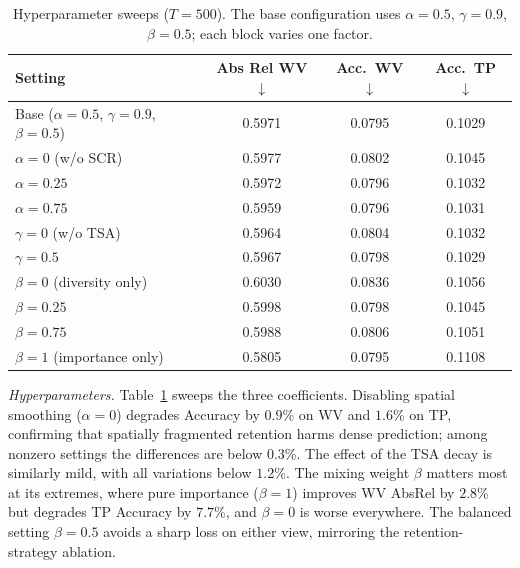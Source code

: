 \begin{table}[t]
    \centering
    \caption{Hyperparameter sweeps ($T{=}500$). The base configuration uses $\alpha{=}0.5$, $\gamma{=}0.9$, $\beta{=}0.5$; each block varies one factor.}
    \label{tab:ab-hyper}
    \tabletext
    \setlength{\tabcolsep}{4pt}
    \begin{tabular}{lccc}
        \toprule
        Setting & Abs Rel WV $\downarrow$ & Acc.\ WV $\downarrow$ & Acc.\ TP $\downarrow$ \\
        \midrule
        Base ($\alpha{=}0.5$, $\gamma{=}0.9$, $\beta{=}0.5$) & 0.5971 & 0.0795 & 0.1029 \\
        \midrule
        $\alpha{=}0$ (w/o SCR) & 0.5977 & 0.0802 & 0.1045 \\
        $\alpha{=}0.25$        & 0.5972 & 0.0796 & 0.1032 \\
        $\alpha{=}0.75$        & 0.5959 & 0.0796 & 0.1031 \\
        \midrule
        $\gamma{=}0$ (w/o TSA) & 0.5964 & 0.0804 & 0.1032 \\
        $\gamma{=}0.5$         & 0.5967 & 0.0798 & 0.1029 \\
        \midrule
        $\beta{=}0$ (diversity only)  & 0.6030 & 0.0836 & 0.1056 \\
        $\beta{=}0.25$                & 0.5998 & 0.0798 & 0.1045 \\
        $\beta{=}0.75$                & 0.5988 & 0.0806 & 0.1051 \\
        $\beta{=}1$ (importance only) & 0.5805 & 0.0795 & 0.1108 \\
        \bottomrule
    \end{tabular}
\end{table}

\textit{Hyperparameters.}
Table~\ref{tab:ab-hyper} sweeps the three coefficients. Disabling spatial smoothing ($\alpha{=}0$) degrades Accuracy by $0.9$\% on WV and $1.6$\% on TP, confirming that spatially fragmented retention harms dense prediction; among nonzero settings the differences are below $0.3$\%. The effect of the TSA decay is similarly mild, with all variations below $1.2$\%. The mixing weight $\beta$ matters most at its extremes, where pure importance ($\beta{=}1$) improves WV AbsRel by $2.8$\% but degrades TP Accuracy by $7.7$\%, and $\beta{=}0$ is worse everywhere. The balanced setting $\beta{=}0.5$ avoids a sharp loss on either view, mirroring the retention-strategy ablation.
